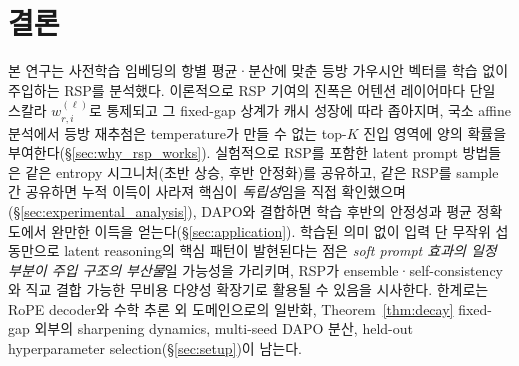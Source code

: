 
\section{결론}\label{sec:conclusion}

본 연구는 사전학습 임베딩의 항별 평균·분산에 맞춘 등방 가우시안 벡터를 학습 없이 주입하는 RSP를 분석했다. 이론적으로 RSP 기여의 진폭은 어텐션 레이어마다 단일 스칼라 $w_{r,i}^{(\ell)}$로 통제되고 그 fixed-gap 상계가 캐시 성장에 따라 좁아지며, 국소 affine 분석에서 등방 재추첨은 temperature가 만들 수 없는 top-$K$ 진입 영역에 양의 확률을 부여한다(\S\ref{sec:why_rsp_works}). 실험적으로 RSP를 포함한 latent prompt 방법들은 같은 entropy 시그니처(초반 상승, 후반 안정화)를 공유하고, 같은 RSP를 sample 간 공유하면 누적 이득이 사라져 핵심이 \emph{독립성}임을 직접 확인했으며(\S\ref{sec:experimental_analysis}), DAPO와 결합하면 학습 후반의 안정성과 평균 정확도에서 완만한 이득을 얻는다(\S\ref{sec:application}). 학습된 의미 없이 입력 단 무작위 섭동만으로 latent reasoning의 핵심 패턴이 발현된다는 점은 \emph{soft prompt 효과의 일정 부분이 주입 구조의 부산물}일 가능성을 가리키며, RSP가 ensemble·self-consistency와 직교 결합 가능한 무비용 다양성 확장기로 활용될 수 있음을 시사한다. 한계로는 RoPE decoder와 수학 추론 외 도메인으로의 일반화, Theorem~\ref{thm:decay} fixed-gap 외부의 sharpening dynamics, multi-seed DAPO 분산, held-out hyperparameter selection(\S\ref{sec:setup})이 남는다.
